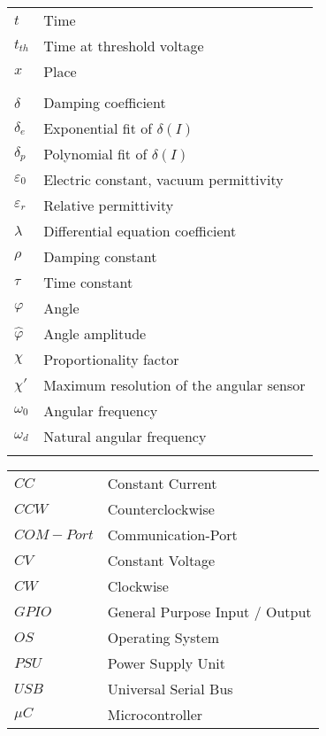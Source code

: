 \begin{longtable}[l]{@{}ll@{}}
	\( t \) & Time\\
	\( t_{th} \) & Time at threshold voltage\\
	\( x \) & Place\\
	\\
	\( \delta \) & Damping coefficient\\
	\( \delta_e \) & Exponential fit of \( \delta(I) \)\\
	\( \delta_p \) & Polynomial fit of \( \delta(I) \)\\
	\( \varepsilon_0 \) & Electric constant, vacuum permittivity\\
	\( \varepsilon_r \) & Relative permittivity\\
	\( \lambda \) & Differential equation coefficient\\
	\( \rho \) & Damping constant\\
	\(\tau\) & Time constant\\
	\( \varphi \) & Angle\\
	\( \hat{\varphi} \) & Angle amplitude\\
    \( \chi \) & Proportionality factor\\
    \( \chi' \) & Maximum resolution of the angular sensor\\
    \( \omega_0 \) & Angular frequency\\
    \( \omega_d \) & Natural angular frequency\\
    \(  \) & \\
\end{longtable}
\label{tab:glossar}
%
%
\begin{longtable}[l]{@{}ll@{}}%
    \( CC \) & Constant Current\\
    \( CCW \) & Counterclockwise\\
    \( COM-Port \) & Communication-Port\\
    \( CV \) & Constant Voltage\\
    \( CW \) & Clockwise\\
    \( GPIO \) & General Purpose Input / Output\\
    \( OS \) & Operating System\\
    \( PSU \) & Power Supply Unit\\
    \( USB \) & Universal Serial Bus\\
    \( \mu C \) & Microcontroller\\
\end{longtable}
\label{tab:acronyms}
